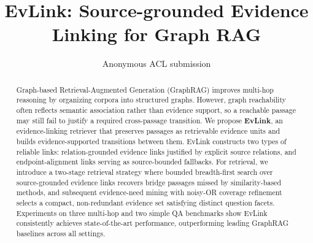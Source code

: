 \documentclass[11pt]{article}
\title{EvLink: Source-grounded Evidence Linking for Graph RAG}
\author{Anonymous ACL submission}
\newcommand{\methodname}{EvLink}
\begin{document}
\maketitle

\begin{abstract}
Graph-based Retrieval-Augmented Generation (GraphRAG) improves multi-hop
reasoning by organizing corpora into structured graphs. However, graph
reachability often reflects semantic association rather than evidence support,
so a reachable passage may still fail to justify a required cross-passage
transition. We propose \textbf{\methodname{}}, an evidence-linking retriever
that preserves passages as retrievable evidence units and builds
evidence-supported transitions between them. \methodname{} constructs two types of reliable
links: relation-grounded evidence links justified by explicit source
relations, and endpoint-alignment links serving as source-bounded
fallbacks. For retrieval, we introduce a two-stage retrieval strategy where bounded breadth-first search over source-grounded evidence links recovers bridge passages missed by similarity-based methods, and subsequent evidence-need mining with noisy-OR coverage refinement selects a compact, non-redundant evidence set satisfying distinct question facets. Experiments on three multi-hop and two simple QA benchmarks show \methodname{} consistently achieves state-of-the-art performance, outperforming leading GraphRAG baselines across all settings.
\end{abstract}










\appendix


\end{document}
